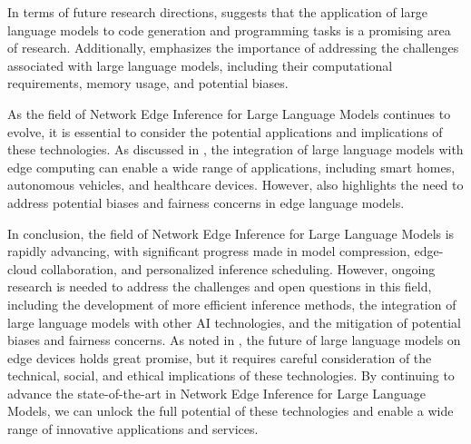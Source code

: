 \documentclass[11pt,a4paper]{article}
\begin{document}
In terms of future research directions, \cite{doi:10.18653/v1/2023.acl-long.411} suggests that the application of large language models to code generation and programming tasks is a promising area of research. Additionally, \cite{doi:10.34133/research.0655} emphasizes the importance of addressing the challenges associated with large language models, including their computational requirements, memory usage, and potential biases.

As the field of Network Edge Inference for Large Language Models continues to evolve, it is essential to consider the potential applications and implications of these technologies. As discussed in \cite{doi:10.1109/comst.2025.3527641}, the integration of large language models with edge computing can enable a wide range of applications, including smart homes, autonomous vehicles, and healthcare devices. However, \cite{arxiv:2502.11349} also highlights the need to address potential biases and fairness concerns in edge language models.

In conclusion, the field of Network Edge Inference for Large Language Models is rapidly advancing, with significant progress made in model compression, edge-cloud collaboration, and personalized inference scheduling. However, ongoing research is needed to address the challenges and open questions in this field, including the development of more efficient inference methods, the integration of large language models with other AI technologies, and the mitigation of potential biases and fairness concerns. As noted in \cite{arxiv:2409.00088}, the future of large language models on edge devices holds great promise, but it requires careful consideration of the technical, social, and ethical implications of these technologies. By continuing to advance the state-of-the-art in Network Edge Inference for Large Language Models, we can unlock the full potential of these technologies and enable a wide range of innovative applications and services.
\end{document}

